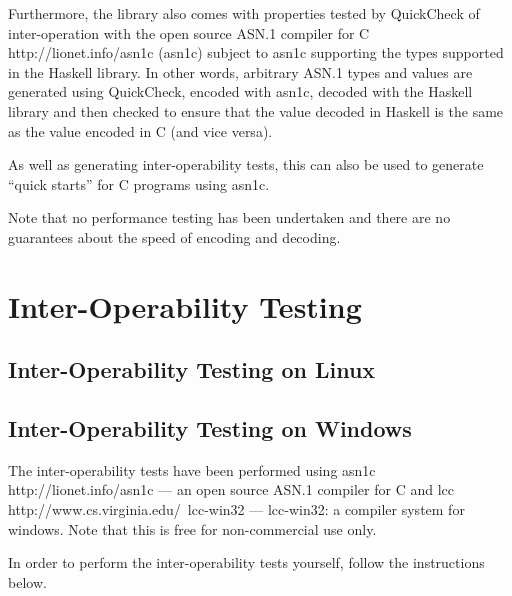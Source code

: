 \documentclass{article}
\begin{document}
Furthermore, the library also comes with properties tested by QuickCheck of inter-operation with
\htmladdnormallinkfoot
{the open source ASN.1 compiler for C}
{http://lionet.info/asn1c}
(asn1c) subject to asn1c supporting the types supported in the Haskell
library. In other words, arbitrary ASN.1 types and values are generated using QuickCheck,
encoded with asn1c, decoded with the Haskell library and then checked
to ensure that the value decoded in Haskell is the same as the value
encoded in C (and vice versa). 

As well as generating inter-operability tests,
this can also be used to generate ``quick starts'' for C programs using asn1c.

Note that no performance testing has been undertaken and there are no
guarantees about the speed of encoding and decoding.

\section{Inter-Operability Testing}

\subsection{Inter-Operability Testing on Linux}



\subsection{Inter-Operability Testing on Windows}

The inter-operability tests have been performed using
\htmladdnormallinkfoot
{asn1c}
{http://lionet.info/asn1c}
--- an open source ASN.1 compiler for C and
\htmladdnormallinkfoot
{lcc}
{http://www.cs.virginia.edu/~lcc-win32}
--- lcc-win32: a compiler system for windows.
Note that this is free for non-commercial use only.

In order to perform the inter-operability tests yourself, follow the
instructions below.
\end{document}
